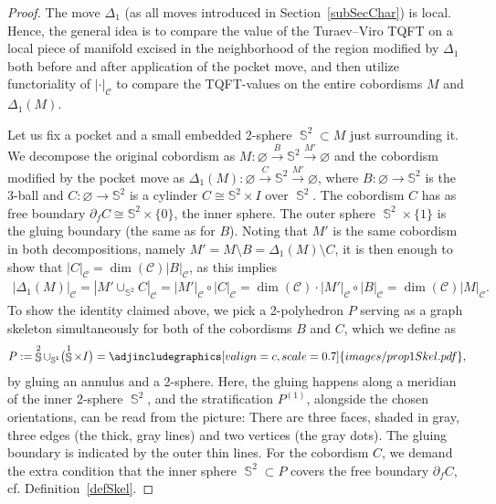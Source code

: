 \documentclass[pdftex]{sigma}
\DeclareMathOperator{\Sp}{\mathbb{S}}
\numberwithin{equation}{section}
\theoremstyle{definition}
\begin{document}
 \begin{proof}
 The move $\Delta_1$ (as all moves introduced in Section~\ref{subSecChar}) is local. Hence, the general idea is to compare the value of the Turaev--Viro TQFT on a local piece of manifold excised in the neighborhood of the region modified by $\Delta_1$ both before and after application of the pocket move, and then utilize functoriality of $|\cdot |_{\mathcal{C}}$ to compare the TQFT-values on the entire cobordisms $M$ and $\Delta_1(M)$.

 Let us fix a pocket and a small embedded 2-sphere $\Sp^2 \subset M$ just surrounding it. We decompose the original cobordism as $M\colon \varnothing \xrightarrow{B} \mathbb{S}^2 \xrightarrow{M'} \varnothing$ and the cobordism modified by the pocket move as $\Delta_1(M)\colon \varnothing \xrightarrow{C} \mathbb{S}^2 \xrightarrow{M'} \varnothing$, where $B\colon \varnothing \rightarrow \mathbb{S}^2$ is the 3-ball and $C\colon \varnothing \rightarrow \mathbb{S}^2$ is a cylinder $C \cong \mathbb{S}^2 \times I$ over $\Sp^2$. The cobordism $C$ has as free boundary $\partial_fC \cong \mathbb{S}^2 \times \{0\}$, the inner sphere. The outer sphere $\Sp^2 \times \{1\}$ is the gluing boundary (the same as for $B$). Noting that $M'$ is the same cobordism in both decompositions, namely $M' = M \setminus B = \Delta_1(M) \setminus C$, it is then enough to show that $|C|_{\mathcal{C}} = \dim(\mathcal{C})|B|_{\mathcal{C}}$, as this implies
 \begin{align*}
 |\Delta_1(M)|_{\mathcal{C}} = |M' \cup_{\mathbb{S}^2} C|_{\mathcal{C}} = |M'|_{\mathcal{C}} \circ |C|_{\mathcal{C}} = \dim(\mathcal{C})\cdot |M'|_{\mathcal{C}} \circ |B|_{\mathcal{C}} = \dim(\mathcal{C})|M|_{\mathcal{C}}.
 \end{align*}
 To show the identity claimed above, we pick a 2-polyhedron $P$ serving as a graph skeleton simultaneously for both of the cobordisms $B$ and $C$, which we define as
 \begin{align*}
 P := \Sp^2 \cup_{\Sp^1} \bigl(\Sp^1 \times I\bigr) = \adjincludegraphics[valign=c, scale = 0.7]{images/prop1Skel.pdf},
 \end{align*}
 by gluing an annulus and a 2-sphere. Here, the gluing happens along a meridian of the inner 2-sphere $\Sp^2$, and the stratification $P^{(1)}$, alongside the chosen orientations, can be read from the picture: There are three faces, shaded in gray, three edges (the thick, gray lines) and two vertices (the gray dots). The gluing boundary is indicated by the outer thin lines. For the cobordism $C$, we demand the extra condition that the inner sphere $\Sp^2 \subset P$ covers the free boundary $\partial_fC$, cf. Definition~\ref{defSkel}.


\end{proof}
\end{document}
